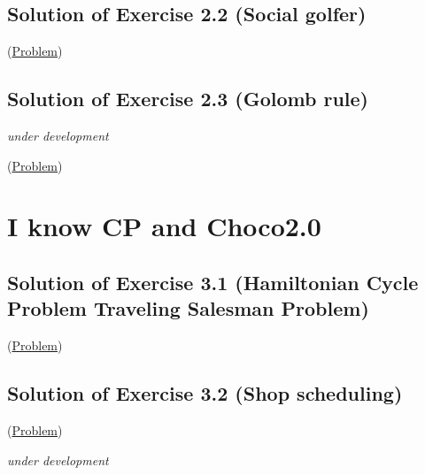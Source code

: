 \subsection{Solution of Exercise 2.2 (Social golfer)}\label{solutions:solutionofexercise2.2}\hypertarget{solutions:solutionofexercise2.2}{}
(\hyperlink{exercises:exercise2.2}{Problem})

\subsection{Solution of Exercise 2.3 (Golomb rule)}\label{solutions:solutionofexercise2.3}\hypertarget{solutions:solutionofexercise2.3}{}

\emph{under development}

(\hyperlink{exercises:exercise2.3}{Problem})

\section{I know CP and Choco2.0}\label{solutions:iknowcpandchoco2.0}\hypertarget{solutions:iknowcpandchoco2.0}{}

\subsection{Solution of Exercise 3.1 (Hamiltonian Cycle Problem Traveling Salesman Problem)}\label{solutions:solutionofexercise3.1}\hypertarget{solutions:solutionofexercise3.1}{}

(\hyperlink{exercises:exercise3.1}{Problem})

\subsection{Solution of Exercise 3.2 (Shop scheduling)}\label{solutions:solutionofexercise3.2}\hypertarget{solutions:solutionofexercise3.2}{}

(\hyperlink{exercises:exercise3.2}{Problem})

\emph{under development}
